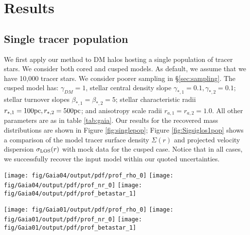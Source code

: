 \section{Results}\label{sec:results}
\subsection{Single tracer population}
We first apply our method to DM halos hosting a single population of
tracer stars. We consider both cored and cusped models. As default, we
assume that we have 10,000 tracer stars. We consider poorer sampling
in \S\ref{sec:sampling}. The cusped model has: $\gamma_{DM}=1$,
stellar central density slope $\gamma_{*,1}=0.1, \gamma_{*,2}=0.1$;
stellar turnover slopes $\beta_{*,1}=\beta_{*,2}=5$; stellar
characteristic radii $r_{*,1}=100\mathrm{pc}, r_{*,2}=500\mathrm{pc}$; and anisotropy
scale radii $r_{a,1}=r_{a,2}=1.0$. All other parameters are as in
table \ref{tab:gaia}. Our results for the recovered mass distributions
are shown in Figure \ref{fig:singlepop}; Figure
\ref{fig:Sigsiglos1pop} shows a comparison of the model tracer surface
density $\Sigma(r)$ and projected velocity dispersion $\sigma_{\text{LOS}}(r)$
with mock data for the cusped case. Notice that in all cases, we
successfully recover the input model within our quoted uncertainties.


\begin{figure*}
    \begin{center}
        \texttt{[image: fig/Gaia04/output/pdf/prof\_rho\_0]}\hspace{-3mm}
        \texttt{[image: fig/Gaia04/output/pdf/prof\_nr\_0]}\hspace{-3mm}
        \texttt{[image: fig/Gaia04/output/pdf/prof\_betastar\_1]}

        \texttt{[image: fig/Gaia01/output/pdf/prof\_rho\_0]}\hspace{-3mm}
        \texttt{[image: fig/Gaia01/output/pdf/prof\_nr\_0]}\hspace{-3mm}
        \texttt{[image: fig/Gaia01/output/pdf/prof\_betastar\_1]}

        \caption{Reconstructed density for Gaia04
          (cored, top), and Gaia01 (cusped,
          bottom); logarithmic density slope; and
          velocity anisotropy profile, using all
          tracer stars, on the order of 3000. The input model
          profile is marked by the blue dashed
          line; the red line and grey contours
          show the median, 68\% and 95\%
          confidence intervals for our chains,
          respectively; the vertical green line
          marks the 3D half-light radius of the
          stars; and the gray lines show a sub-set
          of individual models. The full ensemble
          shown samples of accepted models in
          total.}
        \label{fig:singlepop}
    \end{center}
\end{figure*}

